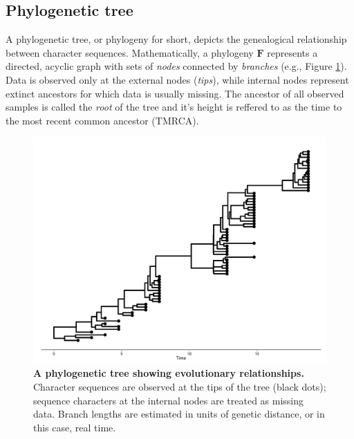 \documentclass[12pt,twoside]{mitthesis}
\theoremstyle{plain}
\theoremstyle{definition}
\theoremstyle{remark}
\begin{document}

\subsection{Phylogenetic tree}

A phylogenetic tree, or phylogeny for short, depicts the genealogical relationship between character sequences.
Mathematically, a phylogeny $\mathbf{F}$ represents a directed, acyclic graph with sets of \emph{nodes} connected by \emph{branches} (e.g., Figure \ref{fig:treeconcept}).
Data is observed only at the external nodes (\emph{tips}), while internal nodes represent extinct ancestors for which data is usually missing.
The ancestor of all observed samples is called the \emph{root} of the tree and it's height is reffered to as the time to the most recent common ancestor (TMRCA).

\begin{figure}[H]
\begin{center}
\includegraphics[scale=0.35]{treeconcept} 
\end{center}
\caption{{ \footnotesize {\bf A phylogenetic tree showing evolutionary relationships.} 
Character sequences are observed at the tips of the tree (black dots); sequence characters at the internal nodes are treated as missing data. 
Branch lengths are estimated in units of genetic distance, or in this case, real time.
}}
\label{fig:treeconcept}
\end{figure}
\end{document}
